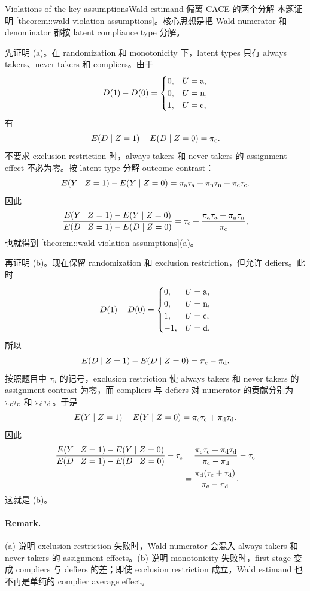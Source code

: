 \begin{exercisesolution}{Violations of the key assumptions}{Wald estimand 偏离 CACE 的两个分解}
本题证明 \cref{theorem::wald-violation-assumptions}。核心思想是把 Wald numerator 和 denominator 都按 latent compliance type 分解。

先证明 (a)。在 randomization 和 monotonicity 下，latent types 只有 always takers、never takers 和 compliers。由于
\[
D(1)-D(0)=
\begin{cases}
0, & U=\textup{a},\\
0, & U=\textup{n},\\
1, & U=\textup{c},
\end{cases}
\]
有
\[
E(D\mid Z=1)-E(D\mid Z=0)=\pi_{\textup{c}}.
\]
不要求 exclusion restriction 时，always takers 和 never takers 的 assignment effect 不必为零。按 latent type 分解 outcome contrast：
\[
E(Y\mid Z=1)-E(Y\mid Z=0)
=
\pi_{\textup{a}}\tau_{\textup{a}}+\pi_{\textup{n}}\tau_{\textup{n}}+\pi_{\textup{c}}\tau_{\textup{c}}.
\]
因此
\[
\frac{E(Y\mid Z=1)-E(Y\mid Z=0)}
     {E(D\mid Z=1)-E(D\mid Z=0)}
=
\tau_{\textup{c}}+\frac{\pi_{\textup{a}}\tau_{\textup{a}}+\pi_{\textup{n}}\tau_{\textup{n}}}{\pi_{\textup{c}}},
\]
也就得到 \cref{theorem::wald-violation-assumptions}(a)。

再证明 (b)。现在保留 randomization 和 exclusion restriction，但允许 defiers。此时
\[
D(1)-D(0)=
\begin{cases}
0, & U=\textup{a},\\
0, & U=\textup{n},\\
1, & U=\textup{c},\\
-1, & U=\textup{d},
\end{cases}
\]
所以
\[
E(D\mid Z=1)-E(D\mid Z=0)=\pi_{\textup{c}}-\pi_{\textup{d}}.
\]
按照题目中 $\tau_u$ 的记号，exclusion restriction 使 always takers 和 never takers 的 assignment contrast 为零，而 compliers 与 defiers 对 numerator 的贡献分别为 $\pi_{\textup{c}}\tau_{\textup{c}}$ 和 $\pi_{\textup{d}}\tau_{\textup{d}}$。于是
\[
E(Y\mid Z=1)-E(Y\mid Z=0)
=
\pi_{\textup{c}}\tau_{\textup{c}}+\pi_{\textup{d}}\tau_{\textup{d}}.
\]
因此
\begin{align*}
\frac{E(Y\mid Z=1)-E(Y\mid Z=0)}
     {E(D\mid Z=1)-E(D\mid Z=0)}
-\tau_{\textup{c}}
&=
\frac{\pi_{\textup{c}}\tau_{\textup{c}}+\pi_{\textup{d}}\tau_{\textup{d}}}
     {\pi_{\textup{c}}-\pi_{\textup{d}}}
-\tau_{\textup{c}}\\
&=
\frac{\pi_{\textup{d}}(\tau_{\textup{c}}+\tau_{\textup{d}})}
     {\pi_{\textup{c}}-\pi_{\textup{d}}}.
\end{align*}
这就是 (b)。

\paragraph{Remark.}
(a) 说明 exclusion restriction 失败时，Wald numerator 会混入 always takers 和 never takers 的 assignment effects。(b) 说明 monotonicity 失败时，first stage 变成 compliers 与 defiers 的差；即使 exclusion restriction 成立，Wald estimand 也不再是单纯的 complier average effect。
\end{exercisesolution}

